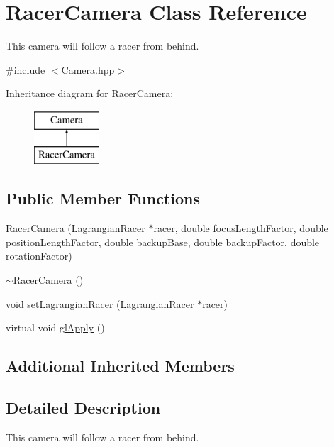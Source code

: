 \hypertarget{class_racer_camera}{\section{Racer\-Camera Class Reference}
\label{class_racer_camera}
}


This camera will follow a racer from behind.  




{\ttfamily \#include $<$Camera.\-hpp$>$}

Inheritance diagram for Racer\-Camera\-:\begin{figure}[H]
\begin{center}
\leavevmode
\includegraphics[height=2.000000cm]{class_racer_camera}
\end{center}
\end{figure}
\subsection*{Public Member Functions}
\begin{DoxyCompactItemize}
\item 
\hyperlink{class_racer_camera_aedc09fd0d4f894d115ec5952c3caa235}{Racer\-Camera} (\hyperlink{class_lagrange_1_1_lagrangian_racer}{Lagrangian\-Racer} $\ast$racer, double focus\-Length\-Factor, double position\-Length\-Factor, double backup\-Base, double backup\-Factor, double rotation\-Factor)
\item 
\hyperlink{class_racer_camera_a01a2fbfaf48a1044a75c5cbe924aea1b}{$\sim$\-Racer\-Camera} ()
\item 
void \hyperlink{class_racer_camera_ad062bb4bd392024505d95d225b6a1128}{set\-Lagrangian\-Racer} (\hyperlink{class_lagrange_1_1_lagrangian_racer}{Lagrangian\-Racer} $\ast$racer)
\item 
virtual void \hyperlink{class_racer_camera_a5e8a09a6290c7284cfc22ec3a8153dac}{gl\-Apply} ()
\end{DoxyCompactItemize}
\subsection*{Additional Inherited Members}


\subsection{Detailed Description}
This camera will follow a racer from behind. 

